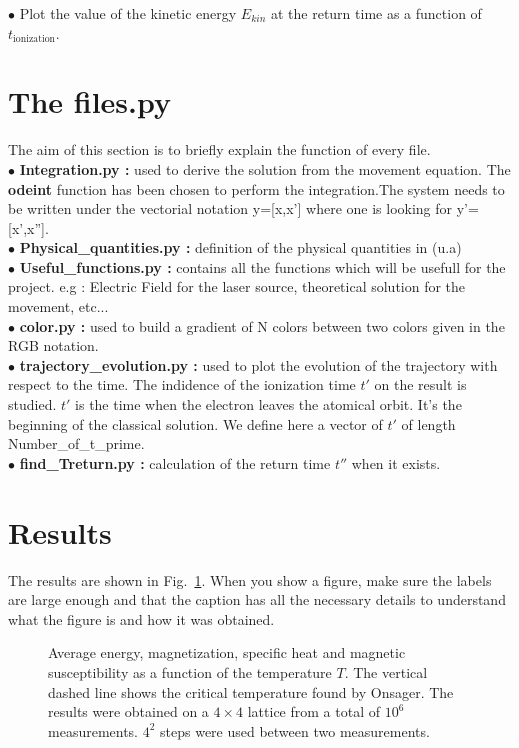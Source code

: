 \documentclass[a4paper,12pt]{article}
\begin{document}
$\bullet$ Plot the value of the kinetic energy $E_{kin}$ at the return time as a function of $t_{\mathrm{ionization}}$.\\


\section{The files.py}
The aim of this section is to briefly explain the function of every file.\\

$\bullet$ \textbf{Integration.py :} used to derive the solution from the movement equation. The \textbf{odeint} function has been chosen to perform the integration.The system needs to be written under the vectorial notation y=[x,x'] where one is looking for y'=[x',x''].\\

$\bullet$ \textbf{Physical\_quantities.py :} definition of the physical quantities in (u.a) \\

$\bullet$ \textbf{Useful\_functions.py :} contains all the functions which will be usefull for the project. e.g : Electric Field for the laser source, theoretical solution for the movement, etc...\\

$\bullet$ \textbf{color.py :} used to build a gradient of N colors between two colors given in the RGB notation.\\

$\bullet$ \textbf{trajectory\_evolution.py :} used to plot the evolution of the trajectory with respect to the time. The indidence of the ionization time $t'$ on the result is studied.
$t'$ is the time when the electron leaves the atomical orbit. It's the beginning of the classical solution. We define here a vector of $t'$ of length Number\_of\_t\_prime.
\\

$\bullet$ \textbf{find\_Treturn.py :} calculation of the return time $t''$ when it exists.\\


\section{Results}

The results are shown in Fig.~\ref{fig:averages}. When you show a figure, make
sure the labels are large enough and that the caption has all the necessary details
to understand what the figure is and how it was obtained.

\begin{figure}[H]
\begin{center}
%
%
\caption{Average energy, magnetization, specific heat and magnetic
susceptibility as a function of the temperature $T$.  The vertical dashed line
shows the critical temperature found by Onsager. The results were obtained
on a $4 \times 4$ lattice from a total of $10^6$ measurements. $4^2$ steps
were used between two measurements.}\label{fig:averages}
%
\end{center}
\end{figure}
\end{document}
